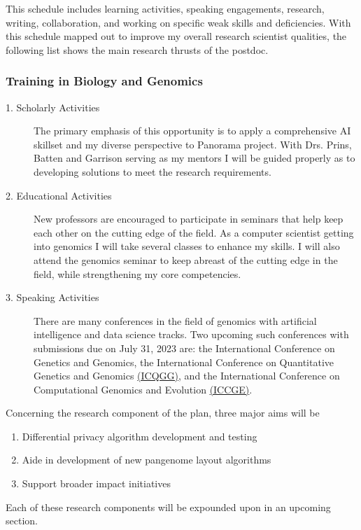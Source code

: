 This schedule includes learning activities, speaking engagements, research, writing, collaboration, and working on specific weak skills and deficiencies.
With this schedule mapped out to improve my overall research scientist qualities, the following list shows the main research thrusts of the postdoc.

\subsubsection{Training in Biology and Genomics}
\begin{description}
    \item[1. Scholarly Activities] The primary emphasis of this opportunity is to apply a comprehensive AI skillset and my diverse perspective to Panorama project. With Drs. Prins, Batten and Garrison serving as my mentors I will be guided properly as to developing solutions to meet the research requirements.
    \item[2. Educational Activities] New professors are encouraged to participate in seminars that help keep each other on the cutting edge of the field. As a computer scientist getting into genomics I will take several classes to enhance my skills. I will also attend the genomics seminar to keep abreast of the cutting edge in the field, while strengthening my core competencies.
    \item[3. Speaking Activities] There are many conferences in the field of genomics with artificial intelligence and data science tracks. Two upcoming such conferences with submissions due on July 31, 2023 are: the International Conference on Genetics and Genomics, the International Conference on Quantitative Genetics and Genomics \href{https://waset.org/quantitative-genetics-and-genomics-conference}{(ICQGG)}, and the International Conference on Computational Genomics and Evolution \href{https://waset.org/computational-genomics-and-evolution-conference}{(ICCGE)}. 
  \end{description}

Concerning the research component of the plan, three major aims will be 
\begin{enumerate}[noitemsep]
    \item Differential privacy algorithm development and testing
	\item Aide in development of new pangenome layout algorithms
	\item Support broader impact initiatives 
\end{enumerate} 

Each of these research components will be expounded upon in an upcoming section.